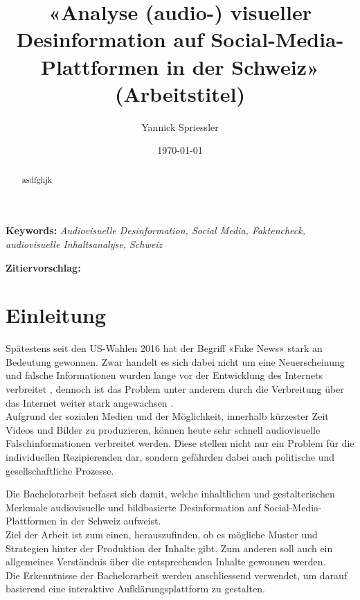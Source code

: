 \documentclass[12pt,a4paper]{article}        %
\title{«Analyse (audio-) visueller Desinformation auf Social-Media-Plattformen in der Schweiz» (Arbeitstitel)}        %
\author{Yannick Spriessler}     %
\date{\today}     %
\begin{document}
\begin{titlingpage} %
  
  \nocite{howard_trees_2017}  %
\end{titlingpage}
\pagebreak      %
\renewcommand{\abstractname}{Abstract}
\begin{abstract}
  \setlength{\parindent}{0pt}
  asdfghjk
\end{abstract}

\textbf{Keywords:} \textit{Audiovisuelle Desinformation, Social Media, Faktencheck, audiovisuelle Inhaltsanalyse, Schweiz}

\textbf{Zitiervorschlag:}
\linebreak
\pagebreak
\thispagestyle{empty}
\setcounter{page}{0}    %
\tableofcontents        %
\pagebreak

\section{Einleitung}
Spätestens seit den US-Wahlen 2016 hat der Begriff «Fake News» stark an Bedeutung gewonnen. Zwar handelt es sich dabei nicht um eine Neuerscheinung und falsche Informationen wurden lange vor der Entwicklung des Internets verbreitet \parencites[214]{allcott_social_2017}[247]{hohlfeld_schlechte_2020}[1]{khan_fake_2021}, dennoch ist das Problem unter anderem durch die Verbreitung über das Internet weiter stark angewachsen \parencites[214–215]{allcott_social_2017}[1]{khan_fake_2021}[1]{lazer_science_2018}[4]{ceron_fake_2021}.\\
Aufgrund der sozialen Medien und der Möglichkeit, innerhalb kürzester Zeit Videos und Bilder zu produzieren, können heute sehr schnell audiovisuelle Falschinformationen verbreitet werden. Diese stellen nicht nur ein Problem für die individuellen Rezipierenden dar, sondern gefährden dabei auch politische und gesellschaftliche Prozesse.

Die Bachelorarbeit befasst sich damit, welche inhaltlichen und gestalterischen Merkmale audiovisuelle und bildbasierte Desinformation auf Social-Media-Plattformen in der Schweiz aufweist. \\
Ziel der Arbeit ist zum einen, herauszufinden, ob es mögliche Muster und Strategien hinter der Produktion der Inhalte gibt. Zum anderen soll auch ein allgemeines Verständnis über die entsprechenden Inhalte gewonnen werden. \\
Die Erkenntnisse der Bachelorarbeit werden anschliessend verwendet, um darauf basierend eine interaktive Aufklärungsplattform zu gestalten.
\end{document}
